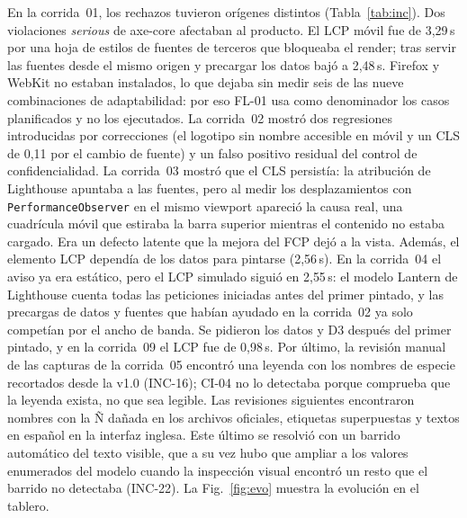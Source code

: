 \documentclass[conference,a4paper]{IEEEtran}
\begin{document}
En la corrida~01, los rechazos tuvieron orígenes distintos (Tabla~\ref{tab:inc}). Dos violaciones \emph{serious} de axe-core afectaban al producto. El LCP móvil fue de 3{,}29\,s por una hoja de estilos de fuentes de terceros que bloqueaba el render; tras servir las fuentes desde el mismo origen y precargar los datos bajó a 2{,}48\,s. Firefox y WebKit no estaban instalados, lo que dejaba sin medir seis de las nueve combinaciones de adaptabilidad: por eso FL-01 usa como denominador los casos planificados y no los ejecutados. La corrida~02 mostró dos regresiones introducidas por correcciones (el logotipo sin nombre accesible en móvil y un CLS de 0,11 por el cambio de fuente) y un falso positivo residual del control de confidencialidad. La corrida~03 mostró que el CLS persistía: la atribución de Lighthouse apuntaba a las fuentes, pero al medir los desplazamientos con \texttt{PerformanceObserver} en el mismo viewport apareció la causa real, una cuadrícula móvil que estiraba la barra superior mientras el contenido no estaba cargado. Era un defecto latente que la mejora del FCP dejó a la vista. Además, el elemento LCP dependía de los datos para pintarse (2{,}56\,s). En la corrida~04 el aviso ya era estático, pero el LCP simulado siguió en 2{,}55\,s: el modelo Lantern de Lighthouse cuenta todas las peticiones iniciadas antes del primer pintado, y las precargas de datos y fuentes que habían ayudado en la corrida~02 ya solo competían por el ancho de banda. Se pidieron los datos y D3 después del primer pintado, y en la corrida~09 el LCP fue de 0{,}98\,s. Por último, la revisión manual de las capturas de la corrida~05 encontró una leyenda con los nombres de especie recortados desde la v1.0 (INC-16); CI-04 no lo detectaba porque comprueba que la leyenda exista, no que sea legible. Las revisiones siguientes encontraron nombres con la Ñ dañada en los archivos oficiales, etiquetas superpuestas y textos en español en la interfaz inglesa. Este último se resolvió con un barrido automático del texto visible, que a su vez hubo que ampliar a los valores enumerados del modelo cuando la inspección visual encontró un resto que el barrido no detectaba (INC-22). La Fig.~\ref{fig:evo} muestra la evolución en el tablero.
\end{document}
